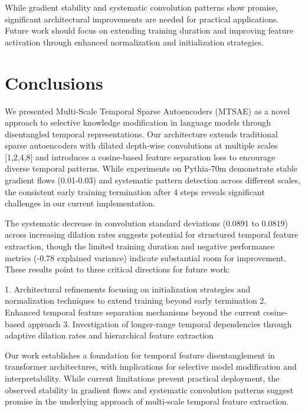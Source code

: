 \documentclass{article} %
\begin{document}
While gradient stability and systematic convolution patterns show promise, significant architectural improvements are needed for practical applications. Future work should focus on extending training duration and improving feature activation through enhanced normalization and initialization strategies.

\section{Conclusions}
\label{sec:conclusions}

We presented Multi-Scale Temporal Sparse Autoencoders (MTSAE) as a novel approach to selective knowledge modification in language models through disentangled temporal representations. Our architecture extends traditional sparse autoencoders with dilated depth-wise convolutions at multiple scales [1,2,4,8] and introduces a cosine-based feature separation loss to encourage diverse temporal patterns. While experiments on Pythia-70m demonstrate stable gradient flows (0.01-0.03) and systematic pattern detection across different scales, the consistent early training termination after 4 steps reveals significant challenges in our current implementation.

The systematic decrease in convolution standard deviations (0.0891 to 0.0819) across increasing dilation rates suggests potential for structured temporal feature extraction, though the limited training duration and negative performance metrics (-0.78 explained variance) indicate substantial room for improvement. These results point to three critical directions for future work:

1. Architectural refinements focusing on initialization strategies and normalization techniques to extend training beyond early termination
2. Enhanced temporal feature separation mechanisms beyond the current cosine-based approach
3. Investigation of longer-range temporal dependencies through adaptive dilation rates and hierarchical feature extraction

Our work establishes a foundation for temporal feature disentanglement in transformer architectures, with implications for selective model modification and interpretability. While current limitations prevent practical deployment, the observed stability in gradient flows and systematic convolution patterns suggest promise in the underlying approach of multi-scale temporal feature extraction.



\end{document}
